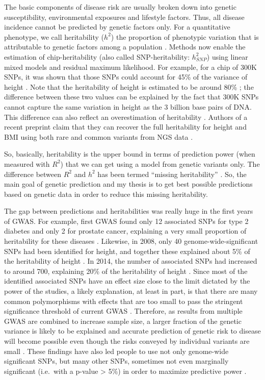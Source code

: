 The basic components of disease risk are usually broken down into genetic susceptibility, environmental exposures and lifestyle factors. Thus, all disease incidence cannot be predicted by genetic factors only.
For a quantitative phenotype, we call heritability ($h^2$) the proportion of phenotypic variation that is attributable to genetic factors among a population \cite[]{visscher2008heritability}.
Methods now enable the estimation of chip-heritability (also called SNP-heritability: $h^2_{SNP}$) using linear mixed models and residual maximum likelihood. For example, for a chip of 300K SNPs, it was shown that those SNPs could account for 45\% of the variance of height \cite[]{yang2010common}.
Note that the heritability of height is estimated to be around 80\% \cite[]{silventoinen2003determinants,visscher2006assumption}; the difference between these two values can be explained by the fact that 300K SNPs cannot capture the same variation in height as the 3 billion base pairs of DNA. This difference can also reflect an overestimation of heritability \cite[]{visscher2008heritability}. Authors of a recent preprint claim that they can recover the full heritability for height and BMI using both rare and common variants from NGS data \cite[]{wainschtein2019recovery}.

So, basically, heritability is the upper bound in terms of prediction power (when measured with $R^2$) that we can get using a model from genetic variants only.
The difference between $R^2$ and $h^2$ has been termed ``missing heritability'' \cite[]{manolio2009finding}. So, the main goal of genetic prediction and my thesis is to get best possible predictions based on genetic data in order to reduce this missing heritability.

The gap between predictions and heritabilities was really huge in the first years of GWAS.
For example, first GWAS found only 12 associated SNPs for type 2 diabetes and only 2 for prostate cancer, explaining a very small proportion of heritability for these diseases \cite[]{jakobsdottir2009interpretation}. 
Likewise, in 2008, only 40 genome-wide-significant SNPs had been identified for height, and together these explained about 5\% of the heritability of height \cite[]{manolio2009finding}. In 2014, the number of associated SNPs had increased to around 700, explaining 20\% of the heritability of height \cite[]{wood2014defining}.
Since most of the identified associated SNPs have an effect size close to the limit dictated by the power of the studies, a likely explanation, at least in part, is that there are many common polymorphisms with effects that are too small to pass the stringent significance threshold of current GWAS \cite[]{wray2008prediction}.
Therefore, as results from multiple GWAS are combined to increase sample size, a larger fraction of the genetic variance is likely to be explained and accurate prediction of genetic risk to disease will become possible even though the risks conveyed by individual variants are small \cite[]{wray2008prediction,wray2018common}.
These findings have also led people to use not only genome-wide significant SNPs, but many other SNPs, sometimes not even marginally significant (i.e.\ with a p-value > 5\%) in order to maximize predictive power \cite[]{purcell2009common,Dudbridge2013,wray2014research}.


